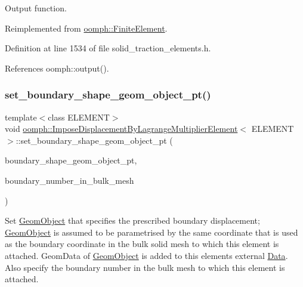Output function. 



Reimplemented from \hyperlink{classoomph_1_1FiniteElement_a2ad98a3d2ef4999f1bef62c0ff13f2a7}{oomph\+::\+Finite\+Element}.



Definition at line 1534 of file solid\+\_\+traction\+\_\+elements.\+h.



References oomph\+::output().

\mbox{\label{classoomph_1_1ImposeDisplacementByLagrangeMultiplierElement_a6efb185b3c2bb21d62cc5df7fccfe56f}} 
\subsubsection{\texorpdfstring{set\+\_\+boundary\+\_\+shape\+\_\+geom\+\_\+object\+\_\+pt()}{set\_boundary\_shape\_geom\_object\_pt()}}
{\footnotesize\ttfamily template$<$class E\+L\+E\+M\+E\+NT$>$ \\
void \hyperlink{classoomph_1_1ImposeDisplacementByLagrangeMultiplierElement}{oomph\+::\+Impose\+Displacement\+By\+Lagrange\+Multiplier\+Element}$<$ E\+L\+E\+M\+E\+NT $>$\+::set\+\_\+boundary\+\_\+shape\+\_\+geom\+\_\+object\+\_\+pt (\begin{DoxyParamCaption}\item[{\hyperlink{classoomph_1_1GeomObject}{Geom\+Object} $\ast$}]{boundary\+\_\+shape\+\_\+geom\+\_\+object\+\_\+pt,  }\item[{const unsigned \&}]{boundary\+\_\+number\+\_\+in\+\_\+bulk\+\_\+mesh }\end{DoxyParamCaption})\hspace{0.3cm}{\ttfamily [inline]}}



Set \hyperlink{classoomph_1_1GeomObject}{Geom\+Object} that specifies the prescribed boundary displacement; \hyperlink{classoomph_1_1GeomObject}{Geom\+Object} is assumed to be parametrised by the same coordinate that is used as the boundary coordinate in the bulk solid mesh to which this element is attached. Geom\+Data of \hyperlink{classoomph_1_1GeomObject}{Geom\+Object} is added to this element\textquotesingle{}s external \hyperlink{classoomph_1_1Data}{Data}. Also specify the boundary number in the bulk mesh to which this element is attached. 



